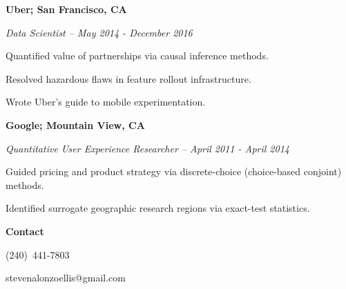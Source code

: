 \documentclass[12pt]{res}
\begin{document}
{\begin{resume}
\begin{minipage}{7.6in}
\vspace{2mm}
\textbf{Uber; San Francisco, CA}

{\it Data Scientist -- May  2014 - December  2016}
\vspace{0.5mm}
\begin{list}{}{\leftmargin=1em}\itemsep-2pt
\item Quantified value of partnerships via causal inference methods.
\item Resolved hazardous flaws in feature rollout infrastructure.
\item Wrote Uber's guide to mobile experimentation.
\end{list}

\vspace{2mm}
\textbf{Google; Mountain View, CA}

{\it Quantitative User Experience Researcher -- April  2011 - April  2014}  
\vspace{0.5mm}
\begin{list}{}{\leftmargin=1em}\itemsep-2pt
\item Guided pricing and product strategy via discrete-choice (choice-based conjoint) methods.
\item Identified surrogate geographic research regions via exact-test statistics.
\end{list}

\vspace{2mm}

\textbf{Contact\hspace{1mm}}\hrulefill
\vspace{2mm}
\begin{list}{}{\leftmargin=0em}\itemsep-2pt
\item (240)~441-7803
\item stevenalonzoellis@gmail.com
\end{list}


\end{minipage}
\end{resume}
} %
\end{document}
